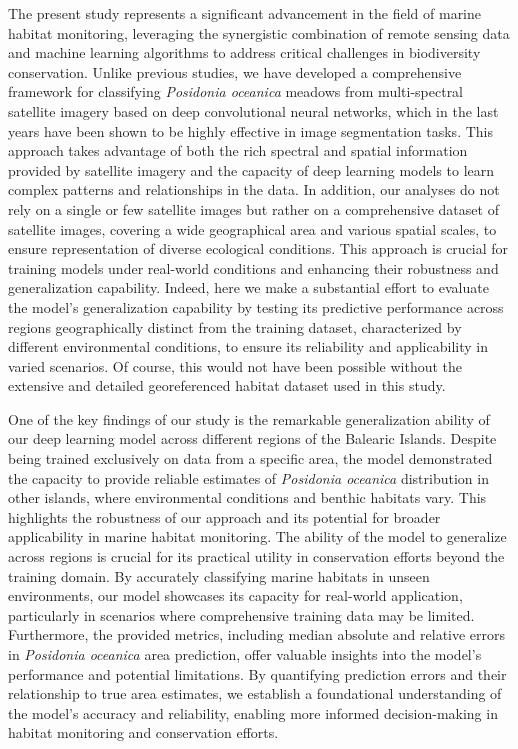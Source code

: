 The present study represents a significant advancement in the field of marine
habitat
monitoring, leveraging the synergistic combination of remote sensing data and
machine learning algorithms to address critical challenges in biodiversity
conservation. Unlike previous studies, we have developed a comprehensive
framework for classifying \textit{Posidonia oceanica} meadows from
multi-spectral satellite imagery based on deep convolutional neural networks,
which in the last years have been shown to be highly effective in image
segmentation tasks. This approach takes advantage of both the rich spectral
and spatial information provided by satellite imagery and the capacity of deep
learning models to learn complex patterns and relationships in the data. In
addition, our analyses do not rely on a single or few satellite images but
rather on a comprehensive dataset of satellite images, covering a wide
geographical area and various spatial scales, to ensure representation of
diverse ecological conditions. This approach is crucial for training models
under real-world conditions and enhancing their robustness and generalization
capability. Indeed, here we make a substantial effort to evaluate the model's
generalization capability by testing its predictive performance across regions
geographically distinct from the training dataset, characterized by different
environmental conditions, to ensure its reliability and applicability in varied
scenarios. Of course, this would not have been possible without the extensive
and detailed georeferenced habitat dataset used in this study.

One of the key findings of our study is the remarkable generalization ability
of our deep learning model across different regions of the Balearic Islands.
Despite being trained exclusively on data from a specific area, the model
demonstrated the capacity to provide reliable estimates of \textit{Posidonia
    oceanica} distribution in other islands, where environmental conditions and
benthic habitats vary. This highlights the robustness of our approach and its
potential for broader applicability in marine habitat monitoring. The ability
of the model to generalize across regions is crucial for its practical utility
in conservation efforts beyond the training domain. By accurately classifying
marine habitats in unseen environments, our model showcases its capacity for
real-world application, particularly in scenarios where comprehensive training
data may be limited. Furthermore, the provided metrics, including median
absolute and relative errors in \textit{Posidonia
    oceanica} area prediction, offer valuable insights into the model's
performance and potential limitations. By quantifying prediction errors and
their relationship to true area estimates, we establish a foundational
understanding of the model's accuracy and reliability, enabling more informed
decision-making in habitat monitoring and conservation efforts.

